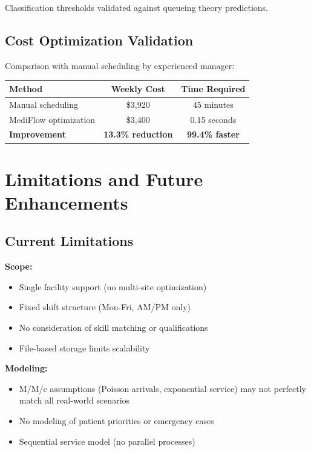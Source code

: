 \documentclass[12pt,a4paper]{article}
\begin{document}
Classification thresholds validated against queueing theory predictions.

\subsection{Cost Optimization Validation}

Comparison with manual scheduling by experienced manager:

\begin{center}
\begin{tabular}{lcc}
\toprule
Method & Weekly Cost & Time Required \\
\midrule
Manual scheduling & \$3,920 & 45 minutes \\
MediFlow optimization & \$3,400 & 0.15 seconds \\
\textbf{Improvement} & \textbf{13.3\% reduction} & \textbf{99.4\% faster} \\
\bottomrule
\end{tabular}
\end{center}

\newpage

\section{Limitations and Future Enhancements}
\label{sec:limitations}

\subsection{Current Limitations}
\label{subsec:current-limits}

\textbf{Scope:}
\begin{itemize}
    \item Single facility support (no multi-site optimization)
    \item Fixed shift structure (Mon-Fri, AM/PM only)
    \item No consideration of skill matching or qualifications
    \item File-based storage limits scalability
\end{itemize}

\textbf{Modeling:}
\begin{itemize}
    \item M/M/c assumptions (Poisson arrivals, exponential service) may not perfectly match all real-world scenarios
    \item No modeling of patient priorities or emergency cases
    \item Sequential service model (no parallel processes)
\end{itemize}
\end{document}
